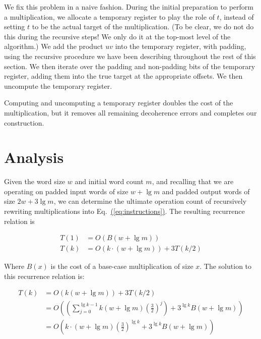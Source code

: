 \documentclass[onecolumn]{quantumarticle}
\newcommand{\eq}[1]{Eq.~\hyperref[eq:#1]{(\ref*{eq:#1})}}
\begin{document}
We fix this problem in a naive fashion.
During the initial preparation to perform a multiplication, we allocate a temporary register to play the role of $t$, instead of setting $t$ to be the actual target of the multiplication.
(To be clear, we do not do this during the recursive steps!
We only do it at the top-most level of the algorithm.)
We add the product $uv$ into the temporary register, with padding, using the recursive procedure we have been describing throughout the rest of this section.
We then iterate over the padding and non-padding bits of the temporary register, adding them into the true target at the appropriate offsets.
We then uncompute the temporary register.

Computing and uncomputing a temporary register doubles the cost of the multiplication, but it removes all remaining decoherence errors and completes our construction.


\section{Analysis}
\label{sec:results}

Given the word size $w$ and initial word count $m$, and recalling that we are operating on padded input words of size $w + \lg m$ and padded output words of size $2w + 3 \lg m$, we can determine the ultimate operation count of recursively rewriting multiplications into \eq{instructions}.
The resulting recurrence relation is

\begin{equation}
    \begin{aligned}
        T(1) &= O(B(w + \lg m))
        \\
        T(k) &= O(k \cdot (w + \lg m)) + 3 T(k/2)
    \end{aligned}
\end{equation}

Where $B(x)$ is the cost of a base-case multiplication of size $x$.
The solution to this recurrence relation is:

\begin{equation}
    \begin{aligned}
T(k) &= O(k (w + \lg m)) + 3 T(k/2)
\\   &= O\left(\left(\sum_{j=0}^{\lg k - 1} k (w + \lg m) \left(\frac{3}{2}\right)^j\right) + 3^{\lg k} B(w + \lg m)\right)
\\   &= O\left(k \cdot (w + \lg m) \left(\frac{3}{2}\right)^{\lg k} + 3^{\lg k} B(w + \lg m)\right)
    \end{aligned}
\end{equation}
\end{document}
